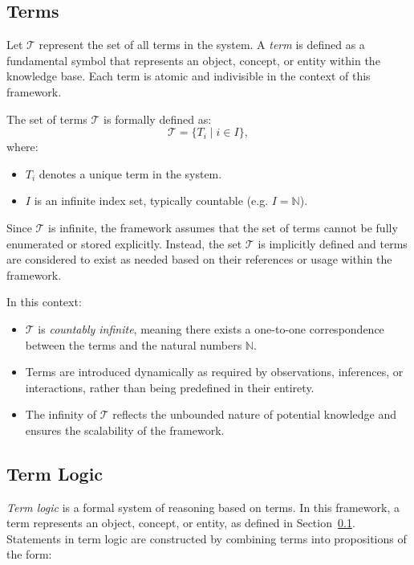 \documentclass{article}
\begin{document}
\subsection{Terms}\label{sec:terms}

Let $\mathcal{T}$ represent the set of all terms in the system. A \emph{term} is defined as a fundamental symbol that represents an object, concept, or entity within the knowledge base. Each term is atomic and indivisible in the context of this framework.

The set of terms $\mathcal{T}$ is formally defined as:
$$
\mathcal{T} = \{ T_i \mid i \in I \},
$$
where:
\begin{itemize}
    \item $T_i$ denotes a unique term in the system.
    \item $I$ is an infinite index set, typically countable (e.g. $I = \mathbb{N}$).
\end{itemize}

Since $\mathcal{T}$ is infinite, the framework assumes that the set of terms cannot be fully enumerated or stored explicitly. Instead, the set $\mathcal{T}$ is implicitly defined and terms are considered to exist as needed based on their references or usage within the framework.

In this context:
\begin{itemize}
    \item $\mathcal{T}$ is \emph{countably infinite}, meaning there exists a one-to-one correspondence between the terms and the natural numbers $\mathbb{N}$.
    \item Terms are introduced dynamically as required by observations, inferences, or interactions, rather than being predefined in their entirety.
    \item The infinity of $\mathcal{T}$ reflects the unbounded nature of potential knowledge and ensures the scalability of the framework.
\end{itemize}


\subsection{Term Logic}\label{section:term_logic}

\emph{Term logic} is a formal system of reasoning based on terms. In this framework, a term represents an object, concept, or entity, as defined in Section~\ref{sec:terms}. Statements in term logic are constructed by combining terms into propositions of the form:
\end{document}
